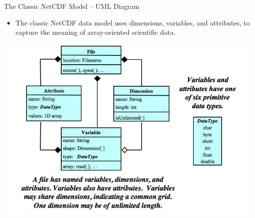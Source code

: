 \documentclass[compress,11pt,xcolor=svgnames,aspectratio=169]{beamer}
\begin{document}
\begin{frame}[fragile]{The Classic NetCDF Model -- UML Diagram}

\begin{itemize}

  \item The classic NetCDF data model uses dimensions, variables, and attributes, to capture the meaning of array-oriented scientific data.

\end{itemize}

\begin{center}
\includegraphics[scale=0.35]{fig/nc-classic-uml}
\end{center}

\nocite{netcdf}

\end{frame}
\end{document}
